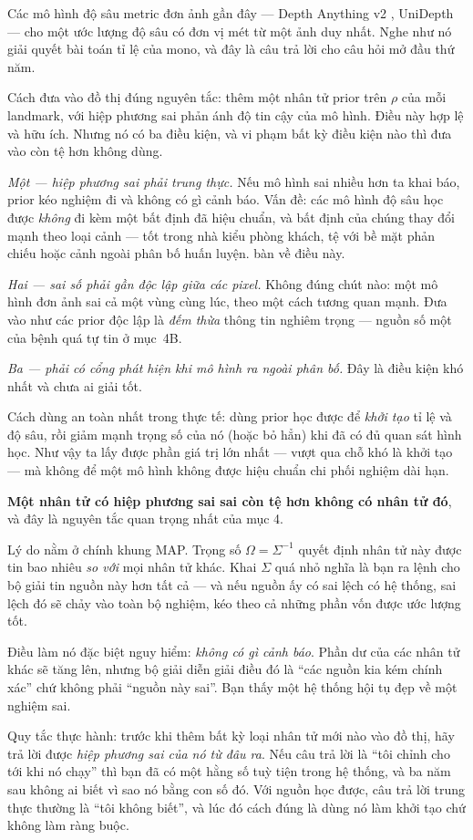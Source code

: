 \documentclass[../../vslam.tex]{subfiles}
\begin{document}
Các mô hình độ sâu metric đơn ảnh gần đây --- Depth Anything v2 \cite{yang2024depthanything2}, UniDepth \cite{piccinelli2024unidepth} --- cho một ước lượng độ sâu có đơn vị mét từ một ảnh duy nhất. Nghe như nó giải quyết bài toán tỉ lệ của mono, và đây là câu trả lời cho câu hỏi mở đầu thứ năm.

Cách đưa vào đồ thị đúng nguyên tắc: thêm một nhân tử prior trên \(\rho\) của mỗi landmark, với hiệp phương sai phản ánh độ tin cậy của mô hình. Điều này hợp lệ và hữu ích. Nhưng nó có ba điều kiện, và vi phạm bất kỳ điều kiện nào thì đưa vào còn tệ hơn không dùng.

\emph{Một --- hiệp phương sai phải trung thực.} Nếu mô hình sai nhiều hơn ta khai báo, prior kéo nghiệm đi và không có gì cảnh báo. Vấn đề: các mô hình độ sâu học được \emph{không} đi kèm một bất định đã hiệu chuẩn, và bất định của chúng thay đổi mạnh theo loại cảnh --- tốt trong nhà kiểu phòng khách, tệ với bề mặt phản chiếu hoặc cảnh ngoài phân bố huấn luyện.  bàn về điều này.

\emph{Hai --- sai số phải gần độc lập giữa các pixel.} Không đúng chút nào: một mô hình đơn ảnh sai cả một vùng cùng lúc, theo một cách tương quan mạnh. Đưa vào như các prior độc lập là \emph{đếm thừa} thông tin nghiêm trọng --- nguồn số một của bệnh quá tự tin ở  mục~4B.

\emph{Ba --- phải có cổng phát hiện khi mô hình ra ngoài phân bố.} Đây là điều kiện khó nhất và chưa ai giải tốt.

Cách dùng an toàn nhất trong thực tế: dùng prior học được để \emph{khởi tạo} tỉ lệ và độ sâu, rồi giảm mạnh trọng số của nó (hoặc bỏ hẳn) khi đã có đủ quan sát hình học. Như vậy ta lấy được phần giá trị lớn nhất --- vượt qua chỗ khó là khởi tạo --- mà không để một mô hình không được hiệu chuẩn chi phối nghiệm dài hạn.

\begin{cambay}
\textbf{Một nhân tử có hiệp phương sai sai còn tệ hơn không có nhân tử đó}, và đây là nguyên tắc quan trọng nhất của mục 4.

Lý do nằm ở chính khung MAP. Trọng số \(\Omega = \Sigma^{-1}\) quyết định nhân tử này được tin bao nhiêu \emph{so với} mọi nhân tử khác. Khai \(\Sigma\) quá nhỏ nghĩa là bạn ra lệnh cho bộ giải tin nguồn này hơn tất cả --- và nếu nguồn ấy có sai lệch có hệ thống, sai lệch đó sẽ chảy vào toàn bộ nghiệm, kéo theo cả những phần vốn được ước lượng tốt.

Điều làm nó đặc biệt nguy hiểm: \emph{không có gì cảnh báo}. Phần dư của các nhân tử khác sẽ tăng lên, nhưng bộ giải diễn giải điều đó là ``các nguồn kia kém chính xác'' chứ không phải ``nguồn này sai''. Bạn thấy một hệ thống hội tụ đẹp về một nghiệm sai.

Quy tắc thực hành: trước khi thêm bất kỳ loại nhân tử mới nào vào đồ thị, hãy trả lời được \emph{hiệp phương sai của nó từ đâu ra}. Nếu câu trả lời là ``tôi chỉnh cho tới khi nó chạy'' thì bạn đã có một hằng số tuỳ tiện trong hệ thống, và ba năm sau không ai biết vì sao nó bằng con số đó. Với nguồn học được, câu trả lời trung thực thường là ``tôi không biết'', và lúc đó cách đúng là dùng nó làm khởi tạo chứ không làm ràng buộc.
\end{cambay}
\end{document}
